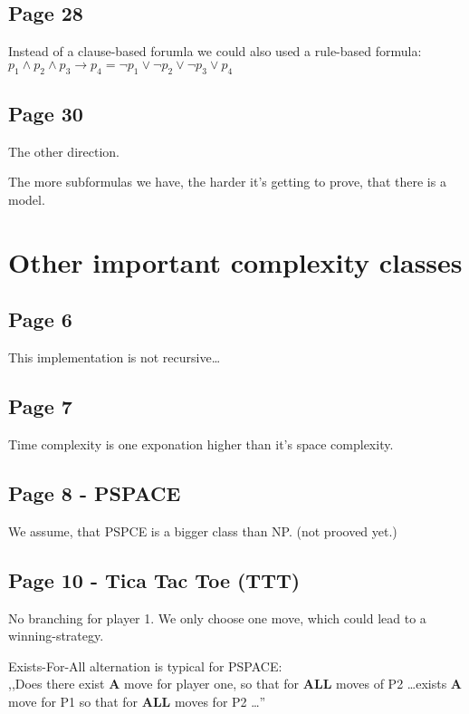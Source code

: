 \documentclass[a4paper]{article}
\begin{document}
\subsection{Page 28}

Instead of a clause-based forumla we could also used a rule-based formula:
$p_1 \wedge p_2 \wedge p_3 \rightarrow p_4  = \neg p_1 \vee \neg p_2 \vee \neg
p_3 \vee p_4$

\subsection{Page 30}
The other direction.

The more subformulas we have, the harder it's getting to prove, that there is a
model.



\section{Other important complexity classes}

\subsection{Page 6}

This implementation is not recursive\ldots

\subsection{Page 7}

Time complexity is one exponation higher than it's space complexity.


\subsection{Page 8 - PSPACE}

We assume, that PSPCE is a bigger class than NP. (not prooved yet.)

\subsection{Page 10 - Tica Tac Toe (TTT)}

No branching for player 1. We only choose one move, which could lead to a
winning-strategy.

Exists-For-All alternation is typical for PSPACE:\\
,,Does there exist \textbf{A} move for
player one, so that for \textbf{ALL} moves of P2 \ldots exists \textbf{A} move
for P1 so that for \textbf{ALL} moves for P2 \ldots''
\end{document}
